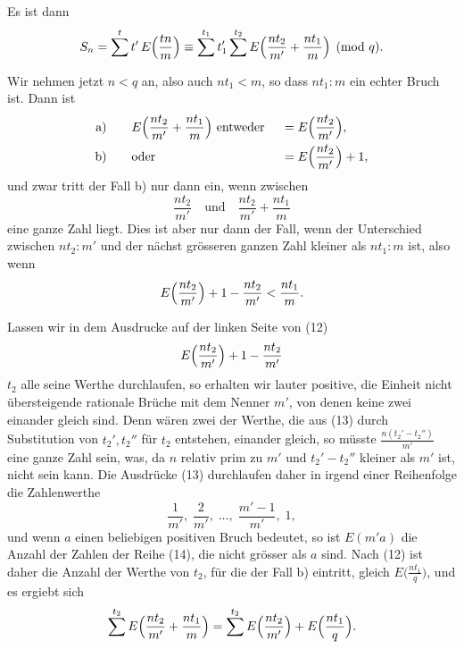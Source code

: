\documentclass[12pt,a4paper]{article}
\begin{document}
Es ist dann
\begin{equation}\label{eq:182-11}
S_n = \sum^t t'\,E\Bigl(\frac{tn}{m}\Bigr) \equiv \sum^{t_1} t_1' \sum^{t_2} E\Bigl(\frac{nt_2}{m'} + \frac{nt_1}{m}\Bigr) \pmod{q}.
\end{equation}

Wir nehmen jetzt $n < q$ an, also auch $nt_1 < m$, so dass $nt_1 : m$ ein echter Bruch ist. Dann ist
\begin{alignat*}{2}
\text{a)}\qquad &E\Bigl(\frac{nt_2}{m'} + \frac{nt_1}{m}\Bigr) \text{ entweder } &&= E\Bigl(\frac{nt_2}{m'}\Bigr),\\
\text{b)}\qquad & \text{oder } &&= E\Bigl(\frac{nt_2}{m'}\Bigr) + 1,
\end{alignat*}
und zwar tritt der Fall b) nur dann ein, wenn zwischen
\[
\frac{nt_2}{m'} \quad \text{und} \quad \frac{nt_2}{m'} + \frac{nt_1}{m}
\]
eine ganze Zahl liegt. Dies ist aber nur dann der Fall, wenn der Unterschied zwischen $nt_2 : m'$ und der nächst grösseren ganzen Zahl kleiner als $nt_1 : m$ ist, also wenn
\begin{equation}\label{eq:182-12}
E\Bigl(\frac{nt_2}{m'}\Bigr) + 1 - \frac{nt_2}{m'} < \frac{nt_1}{m}.
\end{equation}

Lassen wir in dem Ausdrucke auf der linken Seite von (12)
\begin{equation}\label{eq:182-13}
E\Bigl(\frac{nt_2}{m'}\Bigr) + 1 - \frac{nt_2}{m'}
\end{equation}
$t_2$ alle seine Werthe durchlaufen, so erhalten wir lauter positive, die Einheit nicht übersteigende rationale Brüche mit dem Nenner $m'$, von denen keine zwei einander gleich sind. Denn wären zwei der Werthe, die aus (13) durch Substitution von $t_2', t_2''$ für $t_2$ entstehen, einander gleich, so müsste $\frac{n(t_2' - t_2'')}{m'}$ eine ganze Zahl sein, was, da $n$ relativ prim zu $m'$ und $t_2' - t_2''$ kleiner als $m'$ ist, nicht sein kann. Die Ausdrücke (13) durchlaufen daher in irgend einer Reihenfolge die Zahlenwerthe
\begin{equation}\label{eq:182-14}
\frac{1}{m'},\; \frac{2}{m'},\; \ldots,\; \frac{m'-1}{m'},\; 1,
\end{equation}
und wenn $a$ einen beliebigen positiven Bruch bedeutet, so ist $E(m'a)$ die Anzahl der Zahlen der Reihe (14), die nicht grösser als $a$ sind. Nach (12) ist daher die Anzahl der Werthe von $t_2$, für die der Fall b) eintritt, gleich $E\bigl(\frac{nt_1}{q}\bigr)$, und es ergiebt sich
\[
\sum^{t_2} E\Bigl(\frac{nt_2}{m'} + \frac{nt_1}{m}\Bigr) = \sum^{t_2} E\Bigl(\frac{nt_2}{m'}\Bigr) + E\Bigl(\frac{nt_1}{q}\Bigr).
\]
\end{document}
